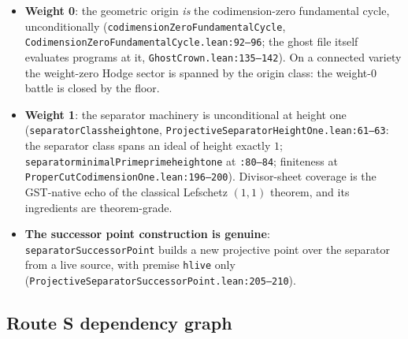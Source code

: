 \documentclass[11pt]{article}
\renewcommand{\_}{\textunderscore\allowbreak}
\begin{document}
\begin{itemize}[leftmargin=2em]
\item \textbf{Weight 0}: the geometric origin \emph{is} the codimension-zero
fundamental cycle, unconditionally
(\texttt{codimensionZeroFundamentalCycle},
\texttt{CodimensionZeroFundamentalCycle.lean:92--96}; the ghost file itself
evaluates programs at it, \texttt{GhostCrown.lean:135--142}). On a connected
variety the weight-zero Hodge sector is spanned by the origin class: the
weight-0 battle is closed by the floor.
\item \textbf{Weight 1}: the separator machinery is unconditional at height
one (\texttt{separatorClass\_height\_one},
\texttt{ProjectiveSeparatorHeightOne.lean:61--63}: the separator class spans
an ideal of height exactly $1$; \texttt{separator\_minimalPrime\_prime\_height\_one}
at \texttt{:80--84}; finiteness at
\texttt{ProperCutCodimensionOne.lean:196--200}). Divisor-sheet coverage is the
GST-native echo of the classical Lefschetz $(1,1)$ theorem, and its ingredients
are theorem-grade.
\item \textbf{The successor point construction is genuine}:
\texttt{separatorSuccessorPoint} builds a new projective point over the
separator from a live source, with premise \texttt{hlive} only
(\texttt{ProjectiveSeparatorSuccessorPoint.lean:205--210}).
\end{itemize}

\subsection{Route S dependency graph}
\end{document}
